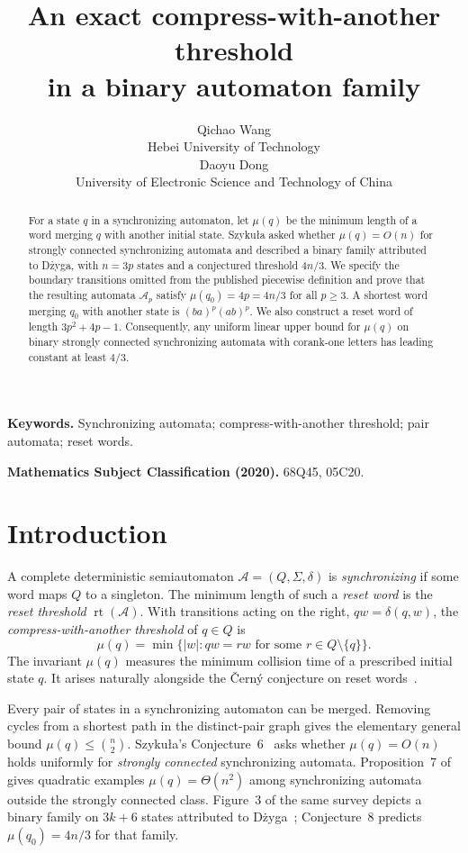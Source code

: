 \documentclass[11pt]{article}
\title{An exact compress-with-another threshold\\ in a binary automaton family}
\author{Qichao Wang\\[0.15em]
{\normalsize Hebei University of Technology}\\[0.65em]
Daoyu Dong\\[0.15em]
{\normalsize University of Electronic Science and Technology of China}}
\date{}
\begin{document}
\maketitle
\begin{abstract}
For a state $q$ in a synchronizing automaton, let $\mu(q)$ be the minimum length of a word merging $q$ with another initial state. Szyku\l a asked whether $\mu(q)=O(n)$ for strongly connected synchronizing automata and described a binary family attributed to D\.{z}yga, with $n=3p$ states and a conjectured threshold $4n/3$. We specify the boundary transitions omitted from the published piecewise definition and prove that the resulting automata $\mathcal A_p$ satisfy $\mu(q_0)=4p=4n/3$ for all $p\geq3$. A shortest word merging $q_0$ with another state is $(ba)^p(ab)^p$. We also construct a reset word of length $3p^2+4p-1$. Consequently, any uniform linear upper bound for $\mu(q)$ on binary strongly connected synchronizing automata with corank-one letters has leading constant at least $4/3$.
\end{abstract}
\medskip
\noindent\textbf{Keywords.} Synchronizing automata; compress-with-another threshold; pair automata; reset words.

\noindent\textbf{Mathematics Subject Classification (2020).} 68Q45, 05C20.

\section{Introduction}
A complete deterministic semiautomaton $\mathcal A=(Q,\Sigma,\delta)$ is \emph{synchronizing} if some word maps $Q$ to a singleton. The minimum length of such a \emph{reset word} is the \emph{reset threshold} $\operatorname{rt}(\mathcal A)$. With transitions acting on the right, $qw=\delta(q,w)$, the \emph{compress-with-another threshold} of $q\in Q$ is
\[
 \mu(q)=\min\{|w|:qw=rw\text{ for some }r\in Q\setminus\{q\}\}.
\]
The invariant $\mu(q)$ measures the minimum collision time of a prescribed initial state $q$. It arises naturally alongside the \v Cern\'y conjecture on reset words~\cite{cerny,volkov}.

Every pair of states in a synchronizing automaton can be merged. Removing cycles from a shortest path in the distinct-pair graph gives the elementary general bound $\mu(q)\leq\binom n2$. Szyku\l a's Conjecture~6~\cite{szykula} asks whether $\mu(q)=O(n)$ holds uniformly for \emph{strongly connected} synchronizing automata. Proposition~7 of~\cite{szykula} gives quadratic examples $\mu(q)=\Theta(n^2)$ among synchronizing automata outside the strongly connected class. Figure~3 of the same survey depicts a binary family on $3k+6$ states attributed to D\.{z}yga~\cite{dzyga}; Conjecture~8 predicts $\mu(q_0)=4n/3$ for that family.
\end{document}

